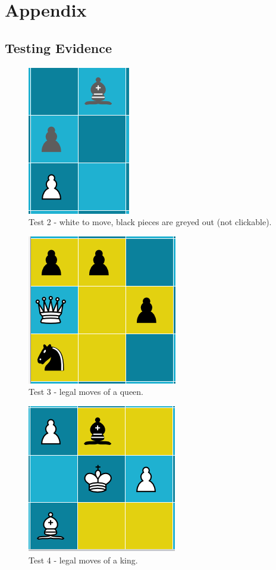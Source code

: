 \appendix
\chapter{Appendix} \label{appendix}
\section{Testing Evidence}
\begin{figure}[H]
	\centering
	\includegraphics{images/screenshots/test-2}
	\caption{Test 2 - white to move, black pieces are greyed out (not clickable).}
	\label{test-2}
\end{figure}
\begin{figure}[H]
	\centering
	\includegraphics{images/screenshots/test-3}
	\caption{Test 3 - legal moves of a queen.}
	\label{test-3}
\end{figure}
\begin{figure}[H]
	\centering
	\includegraphics{images/screenshots/test-4}
	\caption{Test 4 - legal moves of a king.}
	\label{test-4}
\end{figure}
